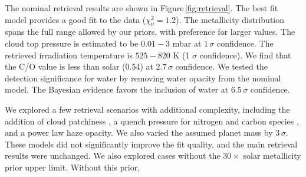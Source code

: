 \documentclass[twocolumn, trackchanges]{aastex61}
\begin{document}

The nominal retrieval results are shown in Figure\,\ref{fig:retrieval}.  The best fit model provides a good fit to the data ($\chi^2_\nu = 1.2$).  The metallicity distribution spans the full range allowed by our priors, with preference for larger values. The cloud top pressure is estimated to be $0.01 - 3$ mbar at $1\,\sigma$ confidence. The retrieved irradiation temperature is $525 - 820$ K (1 $\sigma$ confidence).  We find that the C/O value is less than solar (0.54) at $2.7\,\sigma$ confidence.  We tested the detection significance for water by removing water opacity from the nominal model. The Bayesian evidence favors the inclusion of water at $6.5\,\sigma$ confidence. 

We explored a few retrieval scenarios with additional complexity, including the addition of cloud patchiness \citep{line16}, a quench pressure for nitrogen and carbon species \citep[e.g.][]{morley17}, and a power law haze opacity.  We also varied the assumed planet mass by $3\,\sigma$. These models did not significantly improve the fit quality, and the main retrieval results were unchanged.  We also explored cases without the $30\times$ solar metallicity prior upper limit. Without this prior, 

\end{document}
